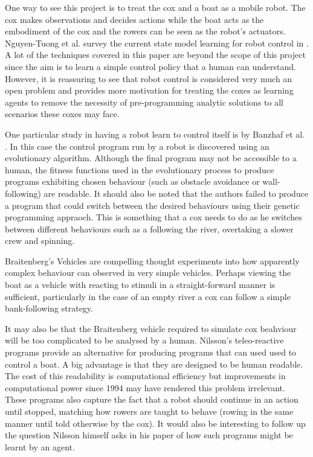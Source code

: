 One way to see this project is to treat the cox and a boat as a mobile
robot. The cox makes observations and decides actions while the boat
acts as the embodiment of the cox and the rowers can be
seen as the robot's actuators. Nguyen-Tuong et al. survey the current state
model learning for robot control in \cite{Nguyen-Tuong2011}. A lot of
the techniques covered in this paper are beyond the scope of
this project since the aim is to learn a simple control policy that a
human can understand. However, it is reassuring to see that robot
control is considered very much an open problem and provides
more motivation for treating the coxes as learning agents to remove the
necessity of pre-programming analytic solutions to all scenarios these
coxes may face.

One particular study in having a robot learn to control itself is by
Banzhaf et al. \cite{Banzhaf1997}. In this case the control program
run by a robot is discovered using an evolutionary algorithm. Although the final program may not be accessible to a
human, the fitness functions used in
the evolutionary process to produce programs exhibiting chosen
behaviour (such as obstacle avoidance or wall-following) are
readable. It should also be noted that the authors failed to produce a program that could switch between the
desired behaviours using their genetic programming appraoch. This is something that a cox needs to do as he
switches between different behaviours such as a following the river, overtaking a
slower crew and spinning.

Braitenberg's Vehicles \cite{Braitenberg1986} are compelling
thought experiments into how apparently complex behaviour can observed in
very simple vehicles. Perhaps viewing the boat as a vehicle with
reacting to stimuli in a straight-forward manner is
sufficient, particularly in the case of an empty river a cox can follow a
simple bank-following strategy.

It may also be that the Braitenberg vehicle required to simulate cox
beahviour will be too complicated to be analysed by a human. Nilsson's
teleo-reactive programs \cite{Nilsson1994} provide an
alternative for producing programs that can used used to control a
boat. A big advantage is that they are designed to be human
readable. The cost of this readability is computational efficiency but
improvements in
computational power since 1994 may have rendered this problem
irrelevant. These programs also capture the fact that a robot should
continue in an action until stopped, matching how rowers are taught to
behave
(rowing in the same manner until told otherwise by the cox). It
would also be interesting to follow up the question Nilsson himself
asks in his paper of how such programs might be learnt by an agent.

